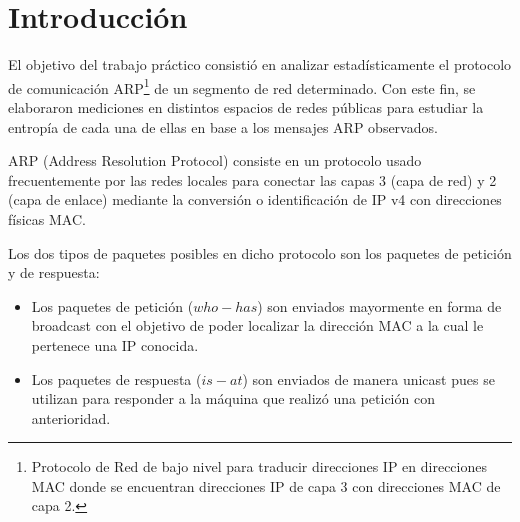 \documentclass[10pt, a4paper]{article}
\author{Teor\'ia de las Comunicaciones, DC, UBA.}
\date{}
\title{}
\begin{document}
	
\thispagestyle{empty}

\maketitle

\tableofcontents
\newpage

\section{Introducción}
El objetivo del trabajo práctico consistió en analizar estadísticamente el protocolo de comunicación ARP\footnote{Protocolo de Red de bajo nivel para traducir direcciones IP en direcciones MAC donde se encuentran direcciones IP de capa 3 con direcciones MAC de capa 2.} de un segmento de red determinado. Con este fin, se elaboraron mediciones en distintos espacios de redes públicas para estudiar la entropía de cada una de ellas en base a los mensajes ARP observados.

ARP (Address Resolution Protocol) consiste en un protocolo usado frecuentemente por las redes locales para conectar las capas 3 (capa de red) y 2 (capa de enlace) mediante la conversión o identificación de IP v4 con direcciones físicas MAC.

Los dos tipos de paquetes posibles en dicho protocolo son los paquetes de petición y de respuesta:
\begin{itemize}
\item Los paquetes de petición ($who-has$) son enviados mayormente en forma de broadcast con el objetivo de poder localizar la dirección MAC a la cual le pertenece una IP conocida.
\item Los paquetes de respuesta ($is-at$) son enviados de manera unicast pues se utilizan para responder a la máquina que realizó una petición con anterioridad.
\end{itemize}
\end{document}
